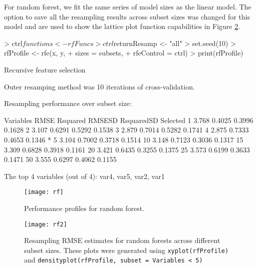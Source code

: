 \documentclass[12pt]{article}
\begin{document}
For random forest, we fit the same series of model sizes as the linear model. The option to save all the resampling results across subset sizes was changed for this model and are used to show the lattice plot function capabilities in Figure \ref{F:rf2}.
\begin{Schunk}
\begin{Sinput}
> ctrl$functions <- rfFuncs
> ctrl$returnResamp <- "all"
> set.seed(10)
> rfProfile <- rfe(x, y,
+                  sizes = subsets,
+                  rfeControl = ctrl)
> print(rfProfile)
\end{Sinput}
\begin{Soutput}
Recursive feature selection

Outer resamping method was 10 iterations of cross-validation. 

Resampling performance over subset size:

 Variables  RMSE Rsquared RMSESD RsquaredSD Selected
         1 3.768   0.4025 0.3996     0.1628         
         2 3.107   0.6291 0.5292     0.1538         
         3 2.879   0.7014 0.5282     0.1741         
         4 2.875   0.7333 0.4653     0.1346        *
         5 3.104   0.7002 0.3718     0.1514         
        10 3.148   0.7123 0.3036     0.1317         
        15 3.309   0.6828 0.3918     0.1161         
        20 3.421   0.6435 0.3255     0.1375         
        25 3.573   0.6199 0.3633     0.1471         
        50 3.555   0.6297 0.4062     0.1155         

The top 4 variables (out of 4):
   var4, var5, var2, var1
\end{Soutput}
\end{Schunk}

\begin{figure}
   \begin{center}		
      \texttt{[image: rf]}
      \caption{Performance profiles for random forest.}
      \label{F:rf} 
    \end{center}
\end{figure}

\begin{figure}
   \begin{center}		
      \texttt{[image: rf2]}
      \caption{Resampling RMSE estimates for random forests across different subset sizes. These plots were generated using \texttt{xyplot(rfProfile)} and \texttt{densityplot(rfProfile, subset = Variables < 5)}}
      \label{F:rf2} 
    \end{center}
\end{figure}
\end{document}

